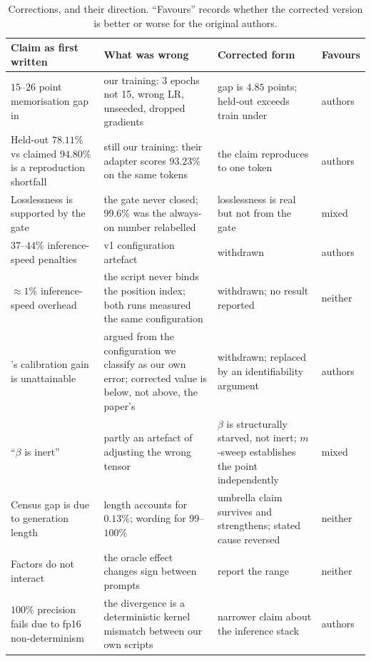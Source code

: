 \begin{table}[h]
\centering
\caption{Corrections, and their direction. ``Favours'' records whether the
corrected version is better or worse for the original authors.}
\label{tab:corrections}
\small
\begin{tabular}{p{5.2cm}p{4.2cm}p{4.2cm}l}
\toprule
Claim as first written & What was wrong & Corrected form & Favours \\
\midrule
$15$--$26$ point memorisation gap in \gc{} & our training: 3 epochs not 15, wrong LR, unseeded, dropped gradients & gap is $4.85$ points; held-out exceeds train under \Ppaper{} & authors \\
\addlinespace
Held-out $78.11\%$ vs claimed $94.80\%$ is a reproduction shortfall & still our training: their adapter scores $93.23\%$ on the same tokens & the claim reproduces to one token & authors \\
\addlinespace
Losslessness is supported by the gate & the gate never closed; $99.6\%$ was the always-on number relabelled & losslessness is real but not from the gate & mixed \\
\addlinespace
$37$--$44\%$ inference-speed penalties & v1 configuration artefact & withdrawn & authors \\
\addlinespace
$\approx 1\%$ inference-speed overhead & the script never binds the position index; both runs measured the same configuration & withdrawn; no result reported & neither \\
\addlinespace
\gp{}'s calibration gain is unattainable & argued from the configuration we classify as our own error; corrected value is below, not above, the paper's & withdrawn; replaced by an identifiability argument & authors \\
\addlinespace
``$\beta$ is inert'' & partly an artefact of adjusting the wrong tensor & $\beta$ is structurally starved, not inert; $m$-sweep establishes the point independently & mixed \\
\addlinespace
Census gap is due to generation length & length accounts for $0.13\%$; wording for $99$--$100\%$ & umbrella claim survives and strengthens; stated cause reversed & neither \\
\addlinespace
Factors do not interact & the oracle effect changes sign between prompts & report the range & neither \\
\addlinespace
$100\%$ precision fails due to fp16 non-determinism & the divergence is a deterministic kernel mismatch between our own scripts & narrower claim about the inference stack & authors \\
\bottomrule
\end{tabular}
\end{table}

